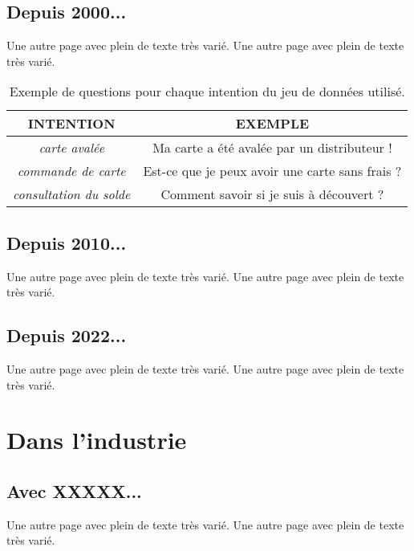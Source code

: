         \subsection{Depuis 2000...}
            Une autre page avec plein de texte très varié.
            Une autre page avec plein de texte très varié.

            \begin{table}[htbp]
                \center\small
                \begin{tabular*}{0.8\linewidth}{cc}
                    \hline
                    \hline
                    INTENTION 
                        & EXEMPLE
                    \tabularnewline
                    \hline
                    \textit{carte avalée}
                        & Ma carte a été avalée par un distributeur !
                        \tabularnewline
                    \textit{commande de carte}
                        & Est-ce que je peux avoir une carte sans frais ?
                        \tabularnewline
                    \textit{consultation du solde}
                        & Comment savoir si je suis à découvert ?
                        \tabularnewline
                \end{tabular*}
                \caption{Exemple de questions pour chaque intention du jeu de données utilisé.}
                \label{TABLEAU_DATASET_TUTO_CARTE_BANCAIRE_V1}
            \end{table}

        \subsection{Depuis 2010...}
            Une autre page avec plein de texte très varié.
            Une autre page avec plein de texte très varié.

        \subsection{Depuis 2022...}
            Une autre page avec plein de texte très varié.
            Une autre page avec plein de texte très varié.

    \section{Dans l'industrie}

        \subsection{Avec XXXXX...}
            Une autre page avec plein de texte très varié.
            Une autre page avec plein de texte très varié.

